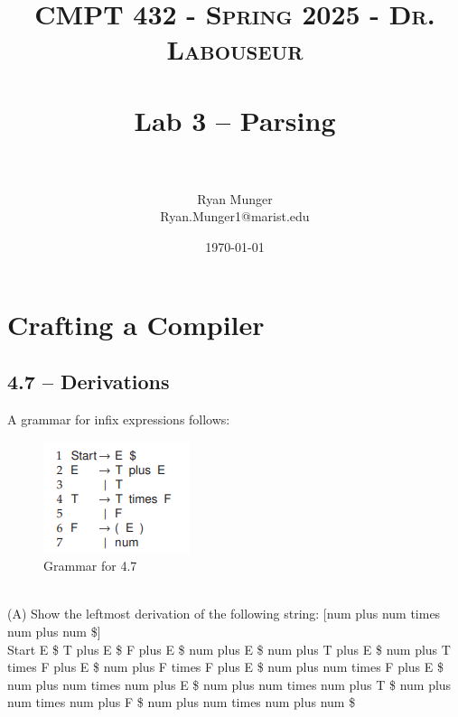 \documentclass[letterpaper, 10pt]{article}
\title{	
   \normalfont \normalsize 
   \textsc{CMPT 432 - Spring 2025 - Dr. Labouseur} \\[10pt] %
   \horrule{0.5pt} \\[0.25cm] 	%
   \huge Lab 3 -- Parsing \\     	    %
   \horrule{0.5pt} \\[0.25cm] 	%
}
\author{Ryan Munger \\ \normalsize Ryan.Munger1@marist.edu}
\date{\normalsize\today} 	%
\begin{document}
\maketitle %


\section{Crafting a Compiler}
\subsection{4.7 -- Derivations}	
A grammar for infix expressions follows: \\
\begin{figure}[h]
    \centering
    \includegraphics[width=0.35\linewidth]{4-7_grammar.png}
    \caption{Grammar for 4.7}
    \label{fig:enter-label}
\end{figure} \\
(A) Show the leftmost derivation of the following string: [num plus num times num plus num \$]\\
Start \newline
E \$ \newline
T plus E \$\newline
F plus E \$\newline
num plus E \$\newline
num plus T plus E \$\newline
num plus T times F plus E \$\newline
num plus F times F plus E \$\newline
num plus num times F plus E \$\newline
num plus num times num plus E \$\newline
num plus num times num plus T \$\newline
num plus num times num plus F \$\newline
num plus num times num plus num \$\newline
\end{document}
